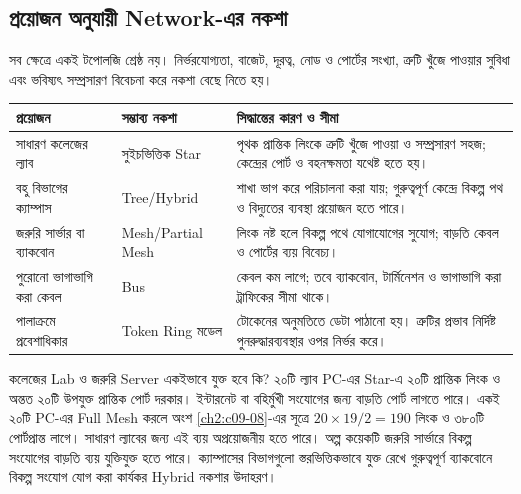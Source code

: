 \subsection{প্রয়োজন অনুযায়ী Network-এর নকশা}
\label{ch2:c09-10}
সব ক্ষেত্রে একই টপোলজি শ্রেষ্ঠ নয়। নির্ভরযোগ্যতা, বাজেট, দূরত্ব, নোড ও পোর্টের সংখ্যা, ত্রুটি খুঁজে পাওয়ার সুবিধা এবং ভবিষ্যৎ সম্প্রসারণ বিবেচনা করে নকশা বেছে নিতে হয়।
\begin{tabularx}{\linewidth}{|p{.28\linewidth}|p{.19\linewidth}|X|}\hline
\textbf{প্রয়োজন} & \textbf{সম্ভাব্য নকশা} & \textbf{সিদ্ধান্তের কারণ ও সীমা}\\\hline
সাধারণ কলেজের ল্যাব & সুইচভিত্তিক Star & পৃথক প্রান্তিক লিংকে ত্রুটি খুঁজে পাওয়া ও সম্প্রসারণ সহজ; কেন্দ্রের পোর্ট ও বহনক্ষমতা যথেষ্ট হতে হয়।\\\hline
বহু বিভাগের ক্যাম্পাস & Tree/Hybrid & শাখা ভাগ করে পরিচালনা করা যায়; গুরুত্বপূর্ণ কেন্দ্রে বিকল্প পথ ও বিদ্যুতের ব্যবস্থা প্রয়োজন হতে পারে।\\\hline
জরুরি সার্ভার বা ব্যাকবোন & Mesh/Partial Mesh & লিংক নষ্ট হলে বিকল্প পথে যোগাযোগের সুযোগ; বাড়তি কেবল ও পোর্টের ব্যয় বিবেচ্য।\\\hline
পুরোনো ভাগাভাগি করা কেবল & Bus & কেবল কম লাগে; তবে ব্যাকবোন, টার্মিনেশন ও ভাগাভাগি করা ট্রাফিকের সীমা থাকে।\\\hline
পালাক্রমে প্রবেশাধিকার & Token Ring মডেল & টোকেনের অনুমতিতে ডেটা পাঠানো হয়। ত্রুটির প্রভাব নির্দিষ্ট পুনরুদ্ধারব্যবস্থার ওপর নির্ভর করে।\\\hline
\end{tabularx}
\begin{examplebox}{কলেজের Lab ও জরুরি Server একইভাবে যুক্ত হবে কি?}
২০টি ল্যাব PC-এর Star-এ ২০টি প্রান্তিক লিংক ও অন্তত ২০টি উপযুক্ত প্রান্তিক পোর্ট দরকার। ইন্টারনেট বা বহির্মুখী সংযোগের জন্য বাড়তি পোর্ট লাগতে পারে। একই ২০টি PC-এর Full Mesh করলে অংশ \ref{ch2:c09-08}-এর সূত্রে $20\times19/2=190$ লিংক ও ৩৮০টি পোর্টপ্রান্ত লাগে। সাধারণ ল্যাবের জন্য এই ব্যয় অপ্রয়োজনীয় হতে পারে। অল্প কয়েকটি জরুরি সার্ভারে বিকল্প সংযোগের বাড়তি ব্যয় যুক্তিযুক্ত হতে পারে। ক্যাম্পাসের বিভাগগুলো স্তরভিত্তিকভাবে যুক্ত রেখে গুরুত্বপূর্ণ ব্যাকবোনে বিকল্প সংযোগ যোগ করা কার্যকর Hybrid নকশার উদাহরণ।
\end{examplebox}

